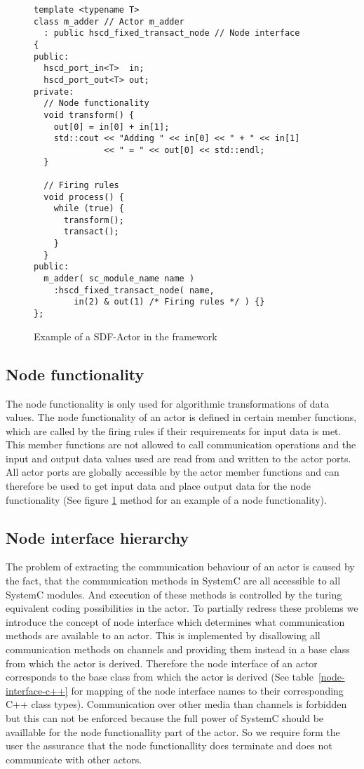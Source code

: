 \begin{figure}
\centering
\begin{verbatim}
template <typename T>
class m_adder // Actor m_adder
  : public hscd_fixed_transact_node // Node interface
{
public:
  hscd_port_in<T>  in;
  hscd_port_out<T> out;
private:
  // Node functionality
  void transform() {
    out[0] = in[0] + in[1];
    std::cout << "Adding " << in[0] << " + " << in[1]
              << " = " << out[0] << std::endl;
  }
  
  // Firing rules
  void process() {
    while (true) {
      transform();
      transact();
    }
  }
public:
  m_adder( sc_module_name name )
    :hscd_fixed_transact_node( name,
        in(2) & out(1) /* Firing rules */ ) {}
};
\end{verbatim}
\caption{\label{example-sdf-actor}Example of a SDF-Actor in the \SysteMoC{} framework}
\end{figure}

\subsection{Node functionality}
The node functionality is only used for algorithmic transformations of data values.
The node functionality of an actor is defined in certain member functions,
which are called by the firing rules if their requirements for input data is met.
This member functions are not allowed to call communication operations and
the input and output data values used are read from
and written to the actor ports. All actor ports are globally accessible
by the actor member functions and can therefore be used to get input data
and place output data for the node functionality
(See figure \ref{example-sdf-actor} method  for an example of a node functionality).

\subsection{Node interface hierarchy}
The problem of extracting the communication behaviour of an actor is caused by the fact,
that the communication methods in SystemC are all accessible to all SystemC modules.
And execution of these methods is controlled by the turing equivalent coding possibilities
in the actor. To partially redress these problems we introduce the concept of node interface
which determines what communication methods are available to an actor. This is implemented
by disallowing all communication methods on \SysteMoC{} channels and providing them instead
in a base class from which the actor is derived. Therefore the node interface of an actor
corresponds to the base class from which the actor is derived
(See table~\ref{node-interface-c++} for mapping of the node interface names to their
corresponding C++ class types).
Communication over other media than \SysteMoC{} channels is forbidden but this can not be enforced
because the full power of SystemC should be availlable for the node functionallity part
of the actor. So we require form the \SysteMoC{} user the assurance that the
node functionallity does terminate and does not communicate with other actors.

